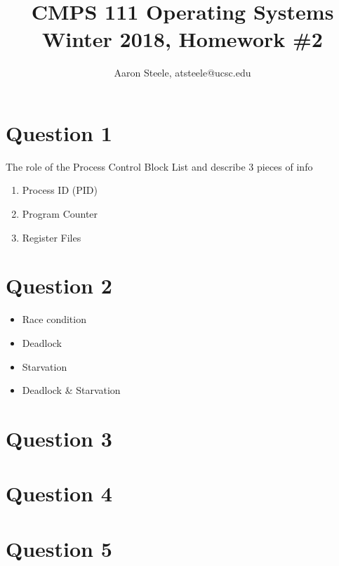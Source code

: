 \documentclass[12pt]{article}
\title{\textbf{CMPS 111 Operating Systems\\ Winter 2018, Homework \#2}}
\date{}
\author{Aaron Steele, atsteele@ucsc.edu}
\begin{document}
  \maketitle
  
  \section*{Question 1}
  The role of the Process Control Block
  List and describe 3 pieces of info
  
  \begin{enumerate}
  	\item Process ID (PID)
  	\item Program Counter
  	\item Register Files
  \end{enumerate}
  


  \section*{Question 2}
  \begin{itemize}
  	\item Race condition
  	\item Deadlock
  	\item Starvation
  	\item Deadlock \& Starvation
  \end{itemize}
  
  
  \section*{Question 3}
 
  \section*{Question 4}  
  
  
  \section*{Question 5}
  
  
  
  
\end{document}
